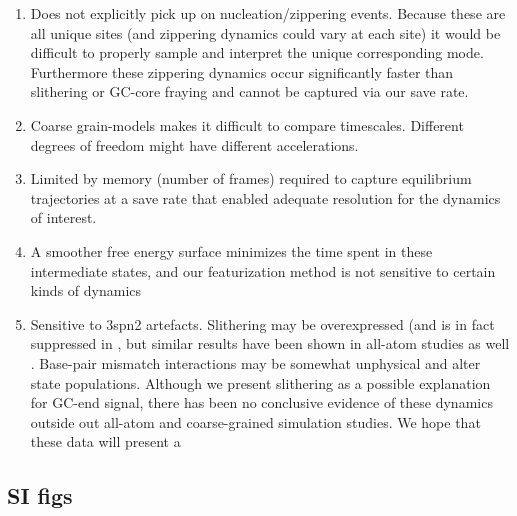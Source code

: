 \documentclass[journal=jpcbfk,manuscript=article]{achemso}
\begin{document}
\begin{enumerate}
	\item Does not explicitly pick up on nucleation/zippering events. Because these are all unique sites (and zippering dynamics could vary at each site) it would be difficult to properly sample and interpret the unique corresponding mode. Furthermore these zippering dynamics occur significantly faster than slithering or GC-core fraying and cannot be captured via our save rate. 
	\item Coarse grain-models makes it difficult to compare timescales. Different degrees of freedom might have different accelerations.
	\item Limited by memory (number of frames) required to capture equilibrium trajectories at a save rate that enabled adequate resolution for the dynamics of interest.
	\item A smoother free energy surface minimizes the time spent in these intermediate states, and our featurization method is not sensitive to certain kinds of dynamics
	\item Sensitive to 3spn2 artefacts. Slithering may be overexpressed (and is in fact suppressed in \citep{Romano2013DNADependence}, but similar results have been shown in all-atom studies as well \citep{Xiao2019}. Base-pair mismatch interactions may be somewhat unphysical and alter state populations. Although we present slithering as a possible explanation for GC-end signal, there has been no conclusive evidence of these dynamics outside out all-atom and coarse-grained simulation studies. We hope that these data will present a 
	
\end{enumerate}


\subsection{\label{sec:Results}SI figs}
\end{document}
